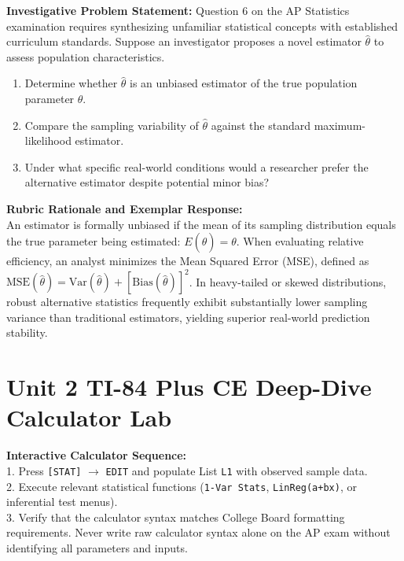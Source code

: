 \begin{frqrubricbox}
\textbf{Investigative Problem Statement:} Question 6 on the AP Statistics examination requires synthesizing unfamiliar statistical concepts with established curriculum standards. Suppose an investigator proposes a novel estimator $\hat{\theta}$ to assess population characteristics.
\begin{enumerate}[label=(\alph*)]
  \item Determine whether $\hat{\theta}$ is an unbiased estimator of the true population parameter $\theta$.
  \item Compare the sampling variability of $\hat{\theta}$ against the standard maximum-likelihood estimator.
  \item Under what specific real-world conditions would a researcher prefer the alternative estimator despite potential minor bias?
\end{enumerate}
\textbf{Rubric Rationale and Exemplar Response:}\\
An estimator is formally unbiased if the mean of its sampling distribution equals the true parameter being estimated: $E(\hat{\theta}) = \theta$. When evaluating relative efficiency, an analyst minimizes the Mean Squared Error (MSE), defined as $\text{MSE}(\hat{\theta}) = \text{Var}(\hat{\theta}) + [\text{Bias}(\hat{\theta})]^2$. In heavy-tailed or skewed distributions, robust alternative statistics frequently exhibit substantially lower sampling variance than traditional estimators, yielding superior real-world prediction stability.
\end{frqrubricbox}\vspace{6pt}
\section{Unit 2 TI-84 Plus CE Deep-Dive Calculator Lab}
\begin{calculatorbox}
\textbf{Interactive Calculator Sequence:}\\
1. Press \texttt{[STAT]} $\rightarrow$ \texttt{EDIT} and populate List \texttt{L1} with observed sample data.\\
2. Execute relevant statistical functions (\texttt{1-Var Stats}, \texttt{LinReg(a+bx)}, or inferential test menus).\\
3. Verify that the calculator syntax matches College Board formatting requirements. Never write raw calculator syntax alone on the AP exam without identifying all parameters and inputs.
\end{calculatorbox}\vspace{10pt}
